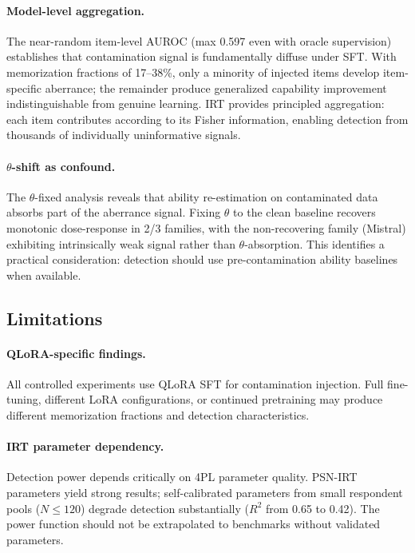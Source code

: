 \documentclass[11pt,a4paper]{article}
\begin{document}
\paragraph{Model-level aggregation.}
The near-random item-level AUROC (max 0.597 even with oracle supervision) establishes that contamination signal is fundamentally diffuse under SFT.
With memorization fractions of 17--38\%, only a minority of injected items develop item-specific aberrance; the remainder produce generalized capability improvement indistinguishable from genuine learning.
IRT provides principled aggregation: each item contributes according to its Fisher information, enabling detection from thousands of individually uninformative signals.

\paragraph{$\theta$-shift as confound.}
The $\theta$-fixed analysis reveals that ability re-estimation on contaminated data absorbs part of the aberrance signal.
Fixing $\theta$ to the clean baseline recovers monotonic dose-response in 2/3 families, with the non-recovering family (Mistral) exhibiting intrinsically weak signal rather than $\theta$-absorption.
This identifies a practical consideration: detection should use pre-contamination ability baselines when available.

\subsection{Limitations}

\paragraph{QLoRA-specific findings.}
All controlled experiments use QLoRA SFT for contamination injection.
Full fine-tuning, different LoRA configurations, or continued pretraining may produce different memorization fractions and detection characteristics.

\paragraph{IRT parameter dependency.}
Detection power depends critically on 4PL parameter quality.
PSN-IRT parameters yield strong results; self-calibrated parameters from small respondent pools ($N\leq120$) degrade detection substantially ($R^2$ from 0.65 to 0.42).
The power function should not be extrapolated to benchmarks without validated parameters.
\end{document}
